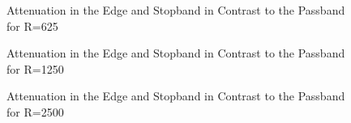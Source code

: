 \begin{figure}
    \centering
    
    \caption[Attenuation in the Edge and Stopband in Contrast to the Passband for R=5]{%
    Attenuation in the Edge and Stopband in Contrast to the Passband for R=625%
    }
    \label{fig:verification:fB5}
\end{figure}

\begin{figure}
    \centering
    
    \caption[Attenuation in the Edge and Stopband in Contrast to the Passband for R=1250]{%
    Attenuation in the Edge and Stopband in Contrast to the Passband for R=1250%
    }
    \label{fig:verification:fB5}
\end{figure}

\begin{figure}
    \centering
    
    \caption[Attenuation in the Edge and Stopband in Contrast to the Passband for R=2500]{%
    Attenuation in the Edge and Stopband in Contrast to the Passband for R=2500%
    }
    \label{fig:verification:fB5}
\end{figure}